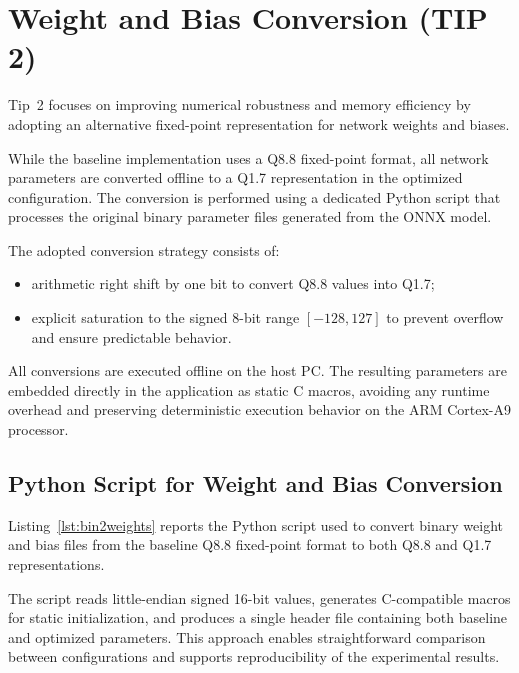 \section{Weight and Bias Conversion (TIP 2)}
\label{sec:appendix_tip2}

Tip~2 focuses on improving numerical robustness and memory efficiency by adopting
an alternative fixed-point representation for network weights and biases.

While the baseline implementation uses a Q8.8 fixed-point format, all network
parameters are converted offline to a Q1.7 representation in the optimized
configuration.
The conversion is performed using a dedicated Python script that processes the
original binary parameter files generated from the ONNX model.

The adopted conversion strategy consists of:
\begin{itemize}
    \item arithmetic right shift by one bit to convert Q8.8 values into Q1.7;
    \item explicit saturation to the signed 8-bit range \([-128, 127]\) to prevent
          overflow and ensure predictable behavior.
\end{itemize}

All conversions are executed offline on the host PC.
The resulting parameters are embedded directly in the application as static
C macros, avoiding any runtime overhead and preserving deterministic execution
behavior on the ARM Cortex-A9 processor.

\subsection{Python Script for Weight and Bias Conversion}
\label{sec:appendix_tip2_script}

Listing~\ref{lst:bin2weights} reports the Python script used to convert binary
weight and bias files from the baseline Q8.8 fixed-point format to both Q8.8
and Q1.7 representations.

The script reads little-endian signed 16-bit values, generates C-compatible
macros for static initialization, and produces a single header file containing
both baseline and optimized parameters.
This approach enables straightforward comparison between configurations and
supports reproducibility of the experimental results.

